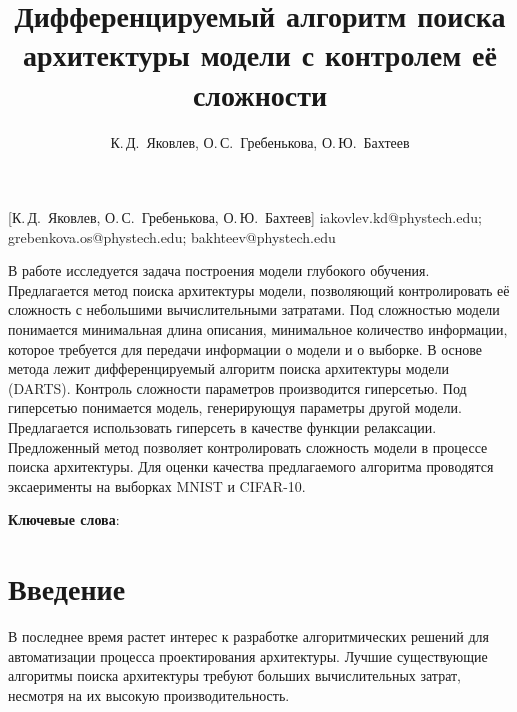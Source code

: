 \documentclass[12pt, twoside]{article}
\begin{document}
\title
    [Дифференцируемый алгоритм поиска архитектуры модели с контролем её сложности] %
    {Дифференцируемый алгоритм поиска архитектуры модели с контролем её сложности}
\author
    [К.\,Д.~Яковлев, О.\,С.~Гребенькова, О.\,Ю.~Бахтеев] %
    {К.\,Д.~Яковлев, О.\,С.~Гребенькова, О.\,Ю.~Бахтеев} %
    [К.\,Д.~Яковлев, О.\,С.~Гребенькова, О.\,Ю.~Бахтеев] %
\email
    { iakovlev.kd@phystech.edu; grebenkova.os@phystech.edu; bakhteev@phystech.edu}

\abstract
    {В работе исследуется задача построения модели глубокого обучения. Предлагается метод поиска архитектуры модели, позволяющий контролировать её сложность с небольшими вычислительными затратами. Под сложностью модели понимается минимальная длина описания,
минимальное количество информации, которое требуется для передачи информации о модели и о выборке. В основе метода лежит дифференцируемый алгоритм поиска архитектуры модели (DARTS). Контроль сложности параметров производится гиперсетью. Под гиперсетью понимается модель, генерирующуя параметры другой модели. Предлагается использовать гиперсеть в качестве функции релаксации. Предложенный метод позволяет контролировать сложность модели в процессе поиска архитектуры. Для оценки качества предлагаемого алгоритма проводятся эксаерименты на выборках MNIST и CIFAR-10.
	
\bigskip
\noindent
\textbf{Ключевые слова}: \emph {}
}





\maketitle
\linenumbers

\section{Введение}

В последнее время растет интерес к разработке алгоритмических решений для автоматизации процесса проектирования архитектуры. Лучшие существующие алгоритмы поиска архитектуры требуют больших вычислительных затрат, несмотря на их высокую производительность.
\end{document}
